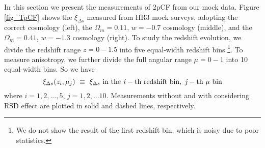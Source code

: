 \documentclass[useAMS,usenatbib]{mn2e}
\begin{document}
\begin{figure*}
   \caption{\label{fig_TpCF}
   The 2pCF measured in four redshift bins, in the correct cosmology (left) and two wrongly assumed cosmologies (middle: $\Omega_m=0.11$, $w=-0.7$; 
   right: $\Omega_m=0.41$, $w=-1.3$). The clustering signal is measured as a function of $1-\mu$, where $\mu=\cos(\theta)$ and $\theta$ is the angle between the LOS and the vector joining the pair of galaxies. 
   Dashed and solid lines show the results with and without the RSD effect, respectively. 
   {\it Upper panel}: In the wrongly assumed cosmologies, we observe a clear change in the amplitudes and shapes of $\xi$ due to the volume and AP effect.
   Additionally, due to the redshift dependence of volume and AP effect,
   the amplitudes and shapes in the four redshift bins are different from each other. 
   {\it Lower panel}: The same as the upper panel, except that the amplitudes of curves are normalized to 1.
   }
\end{figure*}

In this section we present the measurements of 2pCF from our mock data.
Figure \ref{fig_TpCF} shows the $\xi_{\Delta s}$ measured from HR3 mock surveys,
adopting the correct cosmology (left), the $\Omega_m=0.11$, $w=-0.7$ cosmology (middle),
and the $\Omega_m=0.41$, $w=-1.3$ cosmology (right).
To study the redshift evolution, we divide the redshift range $z=0-1.5$ into five equal-width redshift bins
\footnote{We do not show the result of the first redshift bin, which is noisy due to poor statistics.}.
To measure anisotropy, we further divide the full angular range $\mu=0-1$ into 10 equal-width bins.
So we have %
\begin{equation}
\xi_{\Delta s}(z_i,\mu_j)\ \equiv\ \xi_{\Delta s} \rm \ in\ the\ {\it i}-th\ redshift\ bin,\ {\it j}-th\ \mu\ bin
\end{equation}
where $i=1,2,...,5$, $j=1,2,...10$.
Measurements without and with considering RSD effect are plotted in solid and dashed lines, respectively.
\end{document}
